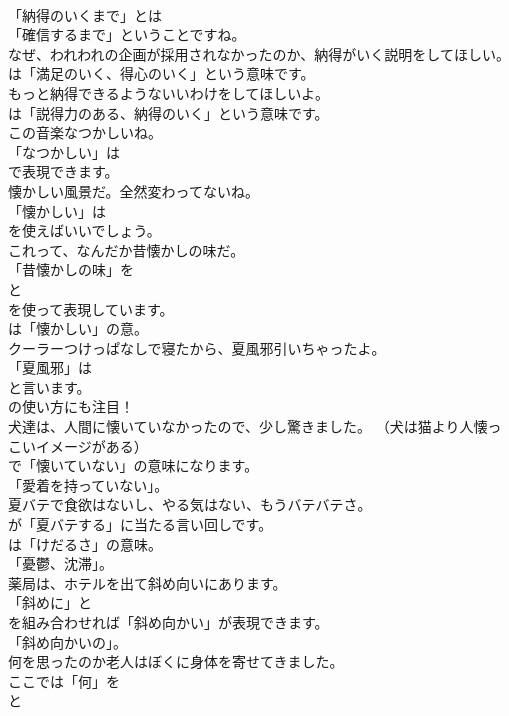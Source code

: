 \documentclass[8pt]{extreport}
\begin{document}
\begin{CJK}{UTF8}{min}
\\	「納得のいくまで」とは
\\	「確信するまで」ということですね。	
\\	なぜ、われわれの企画が採用されなかったのか、納得がいく説明をしてほしい。 
\\	は「満足のいく、得心のいく」という意味です。	
\\	もっと納得できるようないいわけをしてほしいよ。 
\\	は「説得力のある、納得のいく」という意味です。	
\\	この音楽なつかしいね。 
\\	「なつかしい」は
\\	で表現できます。	
\\	懐かしい風景だ。全然変わってないね。 
\\	「懐かしい」は
\\	を使えばいいでしょう。	
\\	これって、なんだか昔懐かしの味だ。 
\\	「昔懐かしの味」を
\\	と
\\	を使って表現しています。
\\	は「懐かしい」の意。	
\\	クーラーつけっぱなしで寝たから、夏風邪引いちゃったよ。 
\\	「夏風邪」は
\\	と言います。
\\	の使い方にも注目！	
\\	犬達は、人間に懐いていなかったので、少し驚きました。 （犬は猫より人懐っこいイメージがある） 
\\	で「懐いていない」の意味になります。
\\	「愛着を持っていない」。	
\\	夏バテで食欲はないし、やる気はない、もうバテバテさ。 
\\	が「夏バテする」に当たる言い回しです。
\\	は「けだるさ」の意味。
\\	「憂鬱、沈滞」。	
\\	薬局は、ホテルを出て斜め向いにあります。 
\\	「斜めに」と
\\	を組み合わせれば「斜め向かい」が表現できます。
\\	「斜め向かいの」。	
\\	何を思ったのか老人はぼくに身体を寄せてきました。 
\\	ここでは「何」を 
\\	と 

\end{CJK}
\end{document}
